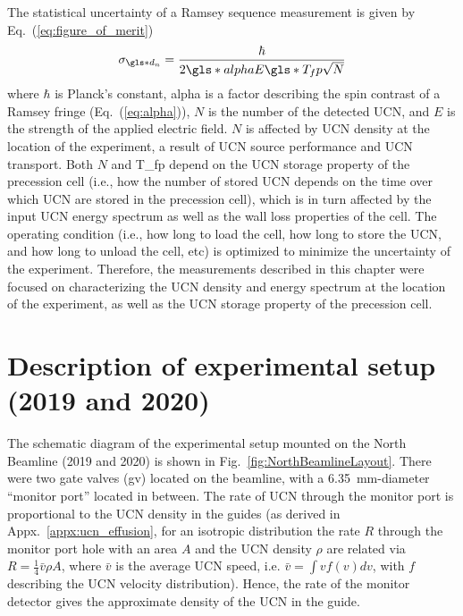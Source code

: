  The statistical uncertainty of a Ramsey sequence measurement is given by Eq.~(\ref{eq:figure_of_merit})
%
\begin{gather*}
    \sigma_{\gls*{d_n}} = \frac{\hbar}{2\gls*{alpha} E \gls*{T_fp} \sqrt{N}}
\end{gather*}
%
where $\hbar$ is Planck’s constant, \gls*{alpha} is a factor describing the spin contrast of a Ramsey fringe (Eq.~(\ref{eq:alpha})), $N$ is the number of the detected UCN, and $E$ is the strength of the applied electric field. $N$ is affected by UCN density at the location of the experiment, a result of UCN source performance and UCN transport. Both $N$ and \gls*{T_fp} depend on the UCN storage property of the precession cell (i.e., how the number of stored UCN depends on the time over which UCN are stored in the precession cell), which is in turn affected by the input UCN energy spectrum as well as the wall loss properties of the cell. The operating condition (i.e., how long to load the cell, how long to store the UCN, and how long to unload the cell, etc) is optimized to minimize the uncertainty of the experiment. Therefore, the measurements described in this chapter were focused on characterizing the UCN density and energy spectrum at the location of the experiment, as well as the UCN storage property of the precession cell. 


\section{\label{sec:northBeamlineSetup}Description of experimental setup (2019 and 2020)}


The schematic diagram of the experimental setup mounted on the North Beamline (2019 and 2020) is shown in Fig.~\ref{fig:NorthBeamlineLayout}. There were two gate valves (\acrshort*{gv}) located on the beamline, with a \qty{6.35}{\mm}-diameter ``monitor port'' located in between. The rate of UCN through the monitor port is proportional to the UCN density in the guides (as derived in Appx.~\ref{appx:ucn_effusion}, for an isotropic distribution the rate $R$ through the monitor port hole with an area $A$ and the UCN density $\rho$ are related via  $R = \frac{1}{4} \bar{v} \rho A$, where $\bar{v}$ is the average UCN speed, i.e. $\bar{v} = \int vf(v)dv$, with $f$ describing the UCN velocity distribution). Hence, the rate of the monitor detector gives the approximate density of the UCN in the guide.

